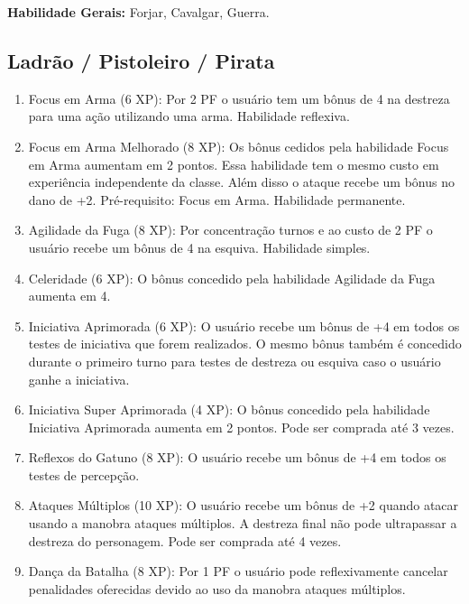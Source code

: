\textbf{Habilidade Gerais:} Forjar, Cavalgar, Guerra.

\subsection{Ladrão / Pistoleiro / Pirata}

\begin{enumerate}

	\item Focus em Arma (6 XP): Por 2 PF o usuário tem um bônus de 4 na destreza para uma ação utilizando uma arma. Habilidade reflexiva.

	\item Focus em Arma Melhorado (8 XP): Os bônus cedidos pela habilidade Focus em Arma aumentam em 2 pontos. Essa habilidade tem o mesmo custo em experiência independente da classe. Além disso o ataque recebe um bônus no dano de +2. Pré-requisito: Focus em Arma. Habilidade permanente.

	\item Agilidade da Fuga (8 XP): Por concentração turnos e ao custo de 2 PF o usuário recebe um bônus de 4 na esquiva. Habilidade simples.
	
	\item Celeridade (6 XP): O bônus concedido pela habilidade Agilidade da Fuga aumenta em 4.
	
	\item Iniciativa Aprimorada (6 XP): O usuário recebe um bônus de +4 em todos os testes de iniciativa que forem realizados. O mesmo bônus também é concedido durante o primeiro turno para testes de destreza ou esquiva caso o usuário ganhe a iniciativa.

	\item Iniciativa Super Aprimorada (4 XP): O bônus concedido pela habilidade Iniciativa Aprimorada aumenta em 2 pontos. Pode ser comprada até 3 vezes.

	\item Reflexos do Gatuno (8 XP): O usuário recebe um bônus de +4 em todos os testes de percepção.

	\item Ataques Múltiplos (10 XP): O usuário recebe um bônus de +2 quando atacar usando a manobra ataques múltiplos. A destreza final não pode ultrapassar a destreza do personagem. Pode ser comprada até 4 vezes. 

	\item Dança da Batalha (8 XP): Por 1 PF o usuário pode reflexivamente cancelar penalidades oferecidas devido ao uso da manobra ataques múltiplos.
	

\end{enumerate}
